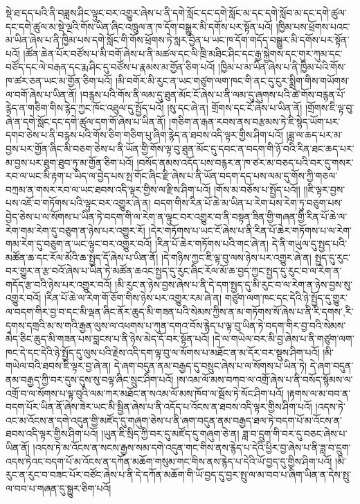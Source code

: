 སྡེ་ཐ་དད་པའི་ནི་བཟླས་ཤིང་ལྟུང་བར་འགྱུར་ཞེས་པ་ནི་དགེ་སློང་དང་དགེ་སློང་མ་དང་དགེ་སློབ་མ་དང་དགེ་ཚུལ་དང་དགེ་ཚུལ་མ་སྡེ་ལྔའི་གོས་ཡིན་ཞིང་འཁྲུལ་ན་ཁ་དོག་བསྒྱུར་མི་དགོས་པར་སྟོན་པའོ། །ཁྱིམ་པས་ཕྲོགས་པའང་མ་ཡིན་ཞེས་པ་ནི་ཁྱིམ་པས་དགེ་སློང་གི་གོས་ཕྲོགས་ཏེ་སླར་བྱིན་པ་ཡང་ཁ་དོག་གདོད་བསྒྱུར་མི་དགོས་པར་སྟོན་པའོ། །ཚོན་ཆེན་པོར་བཙོས་པ་མི་བགོ་ཞེས་པ་ནི་མཚལ་དང་ལི་ཁྲི་མཐིང་ཤིང་དང་རྒྱ་སྐྱེགས་དང་གུར་ཀུམ་དང་བཙོད་དང་ལེ་བརྒན་དང་རྨ་ཤིང་དུ་བཙོས་པ་རྣམས་མ་གྱོན་ཅིག་པའོ། །ཁྱིམ་པ་མ་ཡིན་ཞེས་པ་ནི་ཁྱིམ་པའི་གོས་ཁ་ཚར་ཅན་ཡང་མ་གྱོན་ཅིག་པའོ། །མི་བགོར་མི་རུང་ན་ཡང་གཙུག་ལག་ཁང་གི་ནང་དུ་ངུར་སྨྲིག་གིས་གཡོགས་ལ་བགོ་ཞེས་པ་ཡིན་ནོ། །བརྙས་པའི་གོས་ནི་ལམ་དུ་ཐུན་མོང་ངོ་ཞེས་པ་ནི་ལམ་དུ་ཞུགས་པའི་ཚེ་གོས་བརྙན་པོ་རྙེད་ན་གཅིག་གིས་རྙེད་ཀྱང་ཁོང་འཐུལ་དུ་སྤྱོད་པའོ། །སུ་དང་ཞེ་ན། གྲོགས་དང་ངོ་ཞེས་པ་ཡིན་ནོ། །གྲོགས་ཇི་ལྟ་བུ་ཞེ་ན་དགེ་སློང་དང་དགེ་ཚུལ་དག་གོ་ཞེས་པ་ཡིན་ནོ། །གཅིག་ན་རྒན་རབས་ནས་བརྩམས་ཏེ་ཇི་སྙེད་ཡོག་པར་དགབ་ཅེས་པ་ནི་བརྙས་པའི་གོས་ཅིག་གཅིག་པུ་ཞིག་རྙེད་ན་ཐབས་འདི་ལྟར་གྱིས་ཤིག་པའོ། །ཟླ་ལ་ཆད་པར་མ་བྱས་པར་གྱོན་ཞིང་མི་བཅག་ཅེས་པ་ནི་ཡོན་གྱི་གོས་ལྟ་བུ་ཐུན་མོང་དུ་དབང་ན་བདག་གི་ཉོ་བའི་རིན་ཐང་ཆད་པར་མ་བྱས་པར་ཐུག་ཐུབ་ཏུ་མ་གྱོན་ཅིག་པའོ། །བསོད་ནམས་འདོད་པས་བརྙར་ན་ཁ་ཙར་མ་བཅད་པའི་བར་དུ་གསར་རབ་ལ་ཡང་མི་རྟག་པ་ཡིད་ལ་བྱེད་པས་སྤ་གོང་ཞིང་རྫི་ཞེས་པ་ནི་ཡོན་བདག་དད་པས་ལམ་དུ་གོས་ཀྱི་གཅལ་བཀྲམ་ན་གསར་རབ་ལ་ཡང་ཐབས་འདི་ལྟར་གྱིས་ལ་རྫིས་ཤིག་པའོ། །གོས་མ་བཅོས་པ་སྤྱོད་པའོ།། །།ཇི་ལྟར་བྱས་པས་འཇོ་བ་གཏོགས་པའི་ལྟུང་བར་འགྱུར་ཞེ་ན། བདག་གིས་རིན་པོ་ཆེ་མ་ཡིན་པ་རེག་པས་རེག་ཏུ་བཅུག་པས་བྱེད་ཅེས་པ་ལ་སོགས་པ་ཡིན་ཏེ་བདག་གི་ལ་རེག་ན་ལྟུང་བར་འགྱུར་བ་ནི་བསྟན་ཟིན་གྱི་གཞན་གྱི་རིན་པོ་ཆེ་ལ་རེག་གམ་རེག་དུ་བཅུག་ན་ཉེས་པར་འགྱུར་རོ། །དེར་གཏོགས་པ་ཡང་ངོ་ཞེས་པ་ནི་རིན་པོ་ཆེར་གཏོགས་པ་ལ་རེག་གམ་རེག་དུ་བཅུག་ན་ཡང་ལྟུང་བར་འགྱུར་བའོ། །རིན་པོ་ཆེར་གཏོགས་པའི་གང་ཞེ་ན། དེ་ནི་གཡུལ་དུ་སྤྱད་པའི་མཚོན་ཆ་དང་རོལ་མོའི་ཆ་སྤྱད་དོ་ཞེས་པ་ཡིན་ནོ། །དེ་གཉིས་ཀྱང་ཇི་ལྟ་བུ་ལས་ཉེས་པར་འགྱུར་ཞེ་ན། སྤྱད་དུ་རུང་བར་གྱུར་ན་རྩ་བའོ་ཞེས་པ་ཡིན་ཏེ་མཚོན་ཆའང་སྤྱད་དུ་རུང་ཞིང་རོལ་མོ་ཆ་བྱད་ཀྱང་སྤྱད་དུ་རུང་བ་ལ་རེག་ན་གདོད་རྩ་བའི་ཉེས་པར་འགྱུར་བའོ། །མི་རུང་ན་ཉེས་བྱས་ཞེས་པ་ནི་དེ་དག་སྤྱད་དུ་མི་རུང་བ་ལ་རེག་ན་ཉེས་བྱས་སུ་འགྱུར་བའོ། །རིན་པོ་ཆེ་ལ་རེག་གོ་ཅོག་གིས་ཉེས་པར་འགྱུར་རམ་ཞེ་ན། གཙུག་ལག་ཁང་དང་དེའི་ཉེ་སྤྱོད་དུ་གྱུར་ལ་བདག་གིར་བྱ་བ་དང་མི་ལྡན་ཞིང་ནོར་ཆུད་མི་གཟན་པའི་སེམས་ཀྱིས་ན་མ་གཏོགས་སོ་ཞེས་པ་ནི་{རི་དགས་,རི་དྭགས་}དགྲའི་མ་ས་གའི་རྒྱན་ལུས་ལ་འཕགས་པ་ཀུན་དགའ་བོས་རྙེད་པ་ལྟ་བུ་ཡིན་ཏེ་བདག་གིར་བྱ་བའི་སེམས་མེད་ཅིང་ཆུད་མི་གཟན་པས་བླངས་པ་ནི་ཉེས་མེད་དོ་བར་སྟོན་པའོ། །དེ་ལ་གཡེལ་བར་མི་བྱ་ཞེས་པ་ནི་གཙུག་ལག་ཁང་དེ་དང་དེའི་ཉེ་སྤྱོད་དུ་ལུས་པའི་རྗེས་འདི་དག་ལྟ་བུ་ལ་སོགས་པ་མཐོང་ན་མ་དོར་བར་སྡུས་ཤིག་པའོ། །མི་གཡེལ་བའི་ཐབས་ཇི་ལྟར་བྱ་ཞེ་ན། དེ་ཞག་བདུན་ནམ་བརྒྱད་དུ་བསྲུང་ཞེས་པ་ལ་སོགས་པ་ཡིན་ཏེ། དེ་ཞག་བདུན་ནམ་བརྒྱད་ཀྱི་བར་དུས་དུས་སུ་བལྟ་ཞིང་སྲུང་ཤིག་པའོ། །ས་འམ་ལོ་མས་བཀབ་ལ་འགྲོ་ཞེས་པ་ནི་བསོད་སྙོམས་ལ་འགྲོ་བ་ལ་སོགས་པ་ལྟ་བུའི་ལམ་ཀར་མཐོང་ན་སའམ་ལོ་མས་ཁོབ་ལ་སྦོས་ཏེ་སོང་ཤིག་པའོ། །རྟགས་ལ་མ་བབ་ན་བདག་པོར་ཡིན་ནོ་ཞེས་ཟེར་ཡང་མི་སྦྱིན་ཞེས་པ་ནི་འདོད་པ་འོངས་ན་ཐབས་འདི་ལྟར་གྱིས་ཤིག་པའོ། །འདས་ཏེ་འང་མ་འོངས་ན་དགེ་འདུན་གྱི་མཛོད་དུ་གཞུག་ཅེས་པ་ནི་ཞག་བདུན་ནམ་བརྒྱད་ཐལ་ཏེ་བདག་པོ་མ་འོངས་ན་ཐབས་འདི་ལྟར་གྱིས་ཤིག་པའོ། །ཡུན་ཇི་སྲིད་ཀྱི་བར་དུ་མཛོད་དུ་གཞུག་ཅེ་ན། ཟླ་བ་དྲུག་གི་བར་དུ་བཅང་ཞེས་པ་ཡིན་ནོ། །འདས་ཏེ་མ་འོངས་ན་སངས་རྒྱས་སམ་དགེ་འདུན་གང་གིས་ནས་རྙེད་པ་དེའི་ཕྱིར་བྱ་ཞེས་པ་ནི་ཟླ་བ་དྲུག་འདས་ཏེའང་བདག་པོ་མ་འོངས་ན་དཀོན་མཆོག་གསུམ་གང་གིས་ནས་རྙེད་པ་དེའི་ཡོ་བྱད་དུ་གྱིས་ཤིག་པའོ། །མི་རུང་ན་རུང་བ་བཟང་པོར་བཙོང་ཞེས་པ་ནི་དེ་དཀོན་མཆོག་གི་ཡོ་བྱད་དུ་བྱར་སྤུ་ལ་མ་བབ་པ་ཞིག་ཡིན་ན་དེས་སྤུ་ལ་བབ་པ་གཞན་དུ་སྒྱུར་ཅིག་པའོ། 
